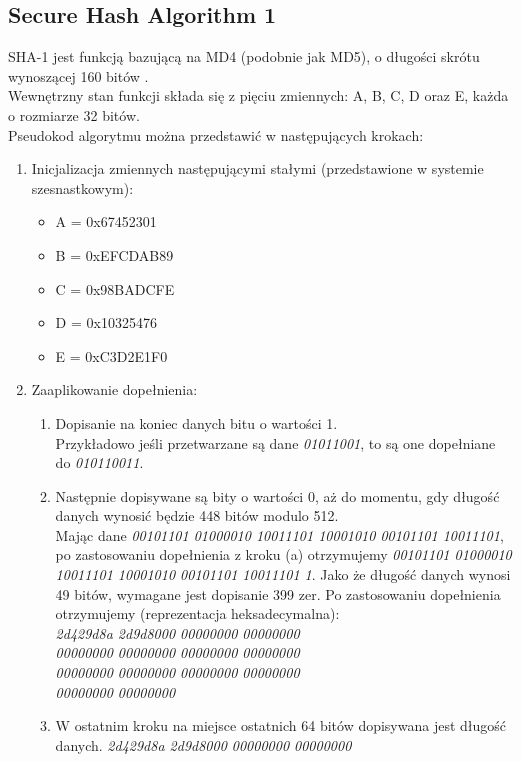 \subsection{Secure Hash Algorithm 1}
SHA-1 jest funkcją bazującą na MD4 (podobnie jak MD5), o długości skrótu wynoszącej 160 bitów \cite{cryptoirf}. \\
Wewnętrzny stan funkcji składa się z pięciu zmiennych: A, B, C, D oraz E, każda o rozmiarze 32 bitów. \\
Pseudokod algorytmu można przedstawić w następujących krokach:
\begin{enumerate}
	\item Inicjalizacja zmiennych następującymi stałymi (przedstawione w systemie szesnastkowym):
		\begin{itemize}
			\item A = 0x67452301
			\item B = 0xEFCDAB89
			\item C = 0x98BADCFE
			\item D = 0x10325476
			\item E = 0xC3D2E1F0
		\end{itemize}
	\item Zaaplikowanie dopełnienia:
		\begin{enumerate}
			\item Dopisanie na koniec danych bitu o wartości 1. \\ 
			Przykładowo jeśli przetwarzane są dane \textit{01011001}, to są one dopełniane do \textit{010110011}.
			\item Następnie dopisywane są bity o wartości 0, aż do momentu, gdy długość danych wynosić będzie 448 bitów modulo 512. \\
			Mając dane \textit{00101101 01000010 10011101 10001010 00101101 10011101}, po zastosowaniu dopełnienia z kroku (a) otrzymujemy \textit{00101101 01000010 10011101 10001010 00101101 10011101 1}. Jako że długość danych wynosi 49 bitów, wymagane jest dopisanie 399 zer. Po zastosowaniu dopełnienia otrzymujemy (reprezentacja heksadecymalna): \\
			\textit{2d429d8a 2d9d8000 00000000 00000000 \\ 
					00000000 00000000 00000000 00000000 \\ 
					00000000 00000000 00000000 00000000 \\ 
					00000000 00000000 }
			\item W ostatnim kroku na miejsce ostatnich 64 bitów dopisywana jest długość danych. 
			\textit{2d429d8a 2d9d8000 00000000 00000000 \\ 
}
\end{enumerate}
\end{enumerate}
